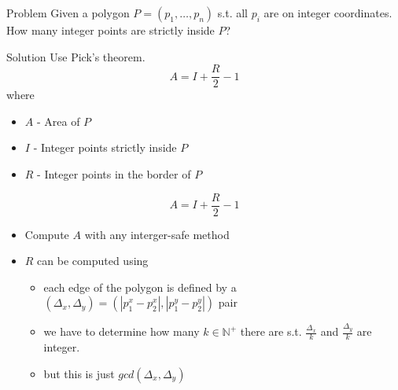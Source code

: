 \begin{slide}
    \begin{block}{Problem}
    	Given a polygon $P=(p_1, \dots ,p_n)$ s.t. all $p_i$ are on integer coordinates.\\
			How many integer points are strictly inside $P$?
	\end{block}
    \begin{block}{Solution}
    	Use Pick's theorem.
			\[A = I + \frac{R}{2} - 1\]
		where
			\begin{itemize}
				\item $A$ - Area of $P$
				\item $I$ - Integer points strictly inside $P$
				\item $R$ - Integer points in the border of $P$
			\end{itemize}
	\end{block}
\end{slide}


\begin{slide}
		\[A = I + \frac{R}{2} - 1\]
		\begin{itemize}
			\item Compute $A$ with any interger-safe method
			\item $R$ can be computed using 
			\begin{itemize}
					\item each edge of the polygon is defined by a $(\Delta_x,\Delta_y) = (|p_1^x - p_2^x| , |p_1^y - p_2^y|)$ pair
					\item we have to determine how many $k \in \mathbb{N}^+$ there are s.t. $\frac{\Delta_x}{k}$ and $\frac{\Delta_y}{k}$ are integer.
					\item but this is just $gcd(\Delta_x,\Delta_y)$
			\end{itemize}
		\end{itemize}
\end{slide}

